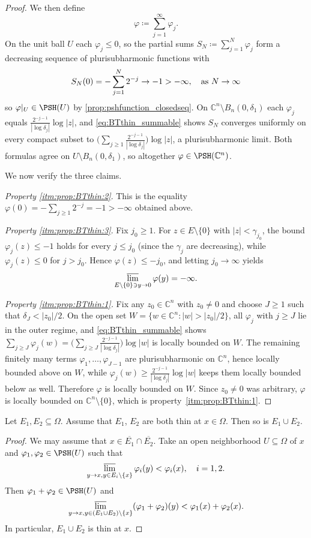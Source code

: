\begin{proof}
We then define
\[
    \varphi\coloneqq \sum_{j=1}^{\infty}\varphi_j.
\]
On the unit ball $U$ each $\varphi_j\leq 0$, so the partial sums $S_N\coloneqq \sum_{j=1}^N\varphi_j$ form a decreasing sequence of plurisubharmonic functions with
\[
    S_N(0)=-\sum_{j=1}^N 2^{-j}\to -1>-\infty,\quad \textup{as } N\to\infty
\]
so $\varphi|_U\in \PSH(U)$ by \cref{prop:pshfunction_closedseq}. On $\mathbb{C}^n\setminus B_n(0,\delta_1)$ each $\varphi_j$ equals $\frac{2^{-j-1}}{|\log\delta_j|}\log|z|$, and \eqref{eq:BTthin_summable} shows $S_N$ converges uniformly on every compact subset to $\bigl(\sum_{j\geq 1}\tfrac{2^{-j-1}}{|\log\delta_j|}\bigr)\log|z|$, a plurisubharmonic limit. Both formulas agree on $U\setminus B_n(0,\delta_1)$, so altogether $\varphi\in \PSH(\mathbb{C}^n)$.

We now verify the three claims.

  \emph{Property \ref{itm:prop:BTthin:2}}. This is the equality $\varphi(0)=-\sum_{j\geq 1}2^{-j}=-1>-\infty$ obtained above.

  \emph{Property \ref{itm:prop:BTthin:3}}. Fix $j_0\geq 1$. For $z\in E\setminus\{0\}$ with $|z|<\gamma_{j_0}$, the bound $\varphi_j(z)\leq -1$ holds for every
  $j\leq j_0$ (since the $\gamma_j$ are decreasing), while $\varphi_j(z)\leq 0$ for $j>j_0$. Hence $\varphi(z)\leq -j_0$, and
  letting $j_0\to \infty$ yields
  \[
    \varlimsup_{E\setminus \{0\} \ni y\to 0}\varphi(y)=-\infty.
  \]

  \emph{Property \ref{itm:prop:BTthin:1}.} Fix any $z_0\in \mathbb{C}^n$ with $z_0\neq 0$ and choose $J\geq 1$ such that $\delta_J<|z_0|/2$. On the open set
  $W=\{w\in \mathbb{C}^n:|w|>|z_0|/2\}$, all $\varphi_j$ with $j\geq J$ lie in the outer regime, and \eqref{eq:BTthin_summable} shows $\sum_{j\geq J}\varphi_j(w)
   =\bigl(\sum_{j\geq J}\tfrac{2^{-j-1}}{|\log\delta_j|}\bigr)\log|w|$ is locally bounded on $W$. The remaining finitely many terms $\varphi_1,\ldots,\varphi_{J-1}$ are plurisubharmonic on $\mathbb{C}^n$, hence locally bounded above on $W$, while $\varphi_j(w)\geq \tfrac{2^{-j-1}}{|\log\delta_j|}\log|w|$ keeps
  them locally bounded below as well. Therefore $\varphi$ is locally bounded on $W$. Since $z_0\neq 0$ was arbitrary, $\varphi$ is locally bounded on $\mathbb{C}^n\setminus\{0\}$, which is property~\ref{itm:prop:BTthin:1}.
\end{proof}

\begin{lemma}\label{lma:unionthin}
    Let $E_1,E_2\subseteq \Omega$. Assume that $E_1$, $E_2$ are both thin at $x\in \Omega$. Then so is $E_1\cup E_2$.
\end{lemma}
\begin{proof}
    We may assume that $x\in \overline{E_1}\cap \overline{E_2}$. Take an open neighborhood $U\subseteq \Omega$ of $x$ and $\varphi_1,\varphi_2\in \PSH(U)$ such that
    \[
        \varlimsup_{y\to x,y\in E_i\setminus\{x\}} \varphi_i(y)<\varphi_i(x),\quad i=1,2.
    \]
    Then $\varphi_1+\varphi_2\in \PSH(U)$ and
    \[
    \varlimsup_{y\to x,y\in (E_1\cup E_2)\setminus\{x\}} (\varphi_1+\varphi_2)(y)<\varphi_1(x)+\varphi_2(x).
    \]
    In particular, $E_1\cup E_2$ is thin at $x$.
\end{proof}

